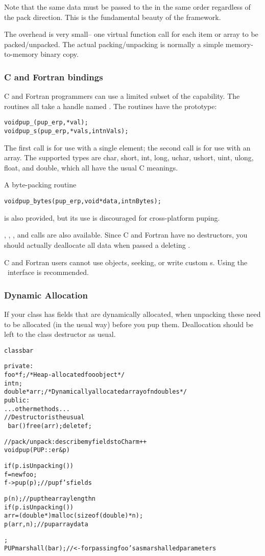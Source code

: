 Note that the same data must be passed to the  
in the same order regardless of the pack direction.
This is the fundamental beauty of the  framework.

The  overhead is very small-- one virtual function call
for each item or array to be packed/unpacked.  The actual packing/unpacking is
normally a simple memory-to-memory binary copy. 

\subsubsection{C and Fortran bindings}
C and Fortran programmers can use a limited subset of the
 capability.  The routines all take a 
handle named .  The routines 
have the prototype:
\begin{alltt}
void pup\_(pup\_er p, *val);
void pup\_s(pup\_er p, *vals,int nVals);
\end{alltt}
The first call is for use with a single element;
the second call is for use with an array.
The supported types are char, short, int, long,
uchar, ushort, uint, ulong, float, and double,
which all have the usual C meanings.

A byte-packing routine
\begin{alltt}
void pup\_bytes(pup\_er p,void *data,int nBytes);
\end{alltt}
is also provided, but its use is discouraged
for cross-platform puping.

, , ,
and  calls are also available.
Since C and Fortran have no destructors, you should 
actually deallocate all data when passed a deleting .

C and Fortran users cannot use  objects, 
seeking, or write custom s. Using the \CC\
interface is recommended.

\subsubsection{Dynamic Allocation}

If your class has fields that are dynamically allocated, when unpacking
these need to be allocated (in the usual way) before you pup them.
Deallocation should be left to the class destructor as usual.

\begin{alltt}
class bar {
private:
    foo *f; /*Heap-allocated foo object*/
    int n;
    double *arr;/*Dynamically allocated array of n doubles*/
public:
    ...other methods...
    //Destructor is the usual
    ~bar() {free(arr);delete f;}
    
    //pack/unpack: describe my fields to Charm++
    void pup(PUP::er &p) {
      if (p.isUnpacking()) 
         f=new foo;
      f->pup(p);//pup f's fields
      
      p(n);//pup the array length n
      if (p.isUnpacking()) 
         arr=(double *)malloc(sizeof(double)*n);
      p(arr,n);//pup array data
    }
};
PUPmarshall(bar); //<- for passing foo's as marshalled parameters
\end{alltt}


